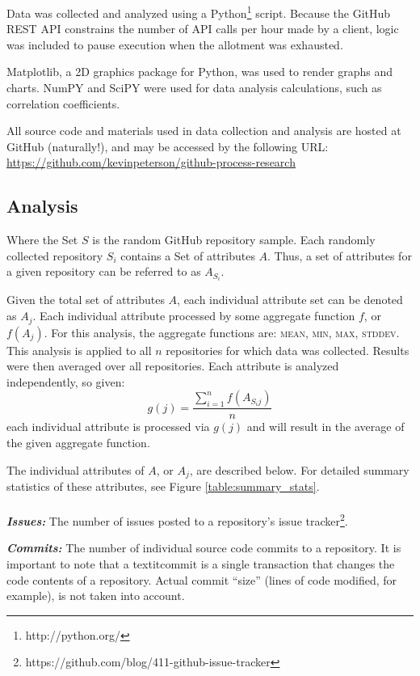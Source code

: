 \documentclass{proc}
\begin{document}
Data was collected and analyzed using a Python\footnote{http://python.org/} script. Because the GitHub REST API constrains the number of API calls per hour made by a client, logic was included to pause execution when the allotment was exhausted.

Matplotlib\cite{Hunter2007}, a 2D graphics package for Python, was used to render graphs and charts. NumPY and SciPY\cite{scipy} were used for data analysis calculations, such as correlation coefficients.

All source code and materials used in data collection and analysis are hosted at GitHub (naturally!), and may be accessed by the following URL: \url{https://github.com/kevinpeterson/github-process-research}

\subsection{Analysis}
Where the Set $S$ is the random GitHub repository sample. Each randomly collected repository $S_i$ contains a Set of attributes $A$. Thus, a set of attributes for a given repository can be referred to as $A_{S_i}$.

Given the total set of attributes $A$, each individual attribute set can be denoted as $A_j$. Each individual attribute processed by some aggregate function $f$, or $f(  A_j )$. For this analysis, the aggregate functions are: \textsc{mean}, \textsc{min}, \textsc{max}, \textsc{stddev}. This analysis is applied to all $n$ repositories for which data was collected. Results were then averaged over all repositories. Each attribute is analyzed independently, so given:
\[ g(j) = \frac{\sum\limits_{i=1}^{n} f(  A_{S{_i}j}  ) } {n} \]
each individual attribute is processed via $g(j)$ and will result in the average of the given aggregate function.

The individual attributes of $A$, or $A_j$, are described below. For detailed summary statistics of these attributes, see Figure  \ref{table:summary_stats}.\\\\
\noindent \textbf{\textit{Issues:}}
The number of issues posted to a repository's issue tracker\footnote{https://github.com/blog/411-github-issue-tracker}.

\noindent \textbf{\textit{Commits:}}
The number of individual source code commits to a repository. It is important to note that a textit{commit} is a single transaction that changes the code contents of a repository. Actual commit ``size'' (lines of code modified, for example), is not taken into account.
\end{document}
